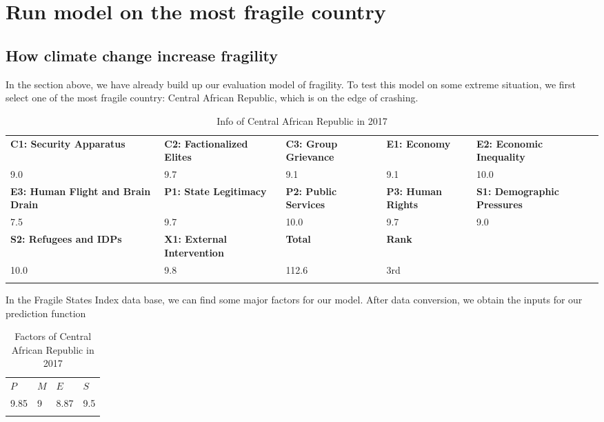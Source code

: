 \documentclass{mcmthesis}
\newlength\savedwidth
\newcommand\whline{\noalign{\global\savedwidth\arrayrulewidth
		\global\arrayrulewidth 1.2pt}%
	\hline
	\noalign{\global\arrayrulewidth\savedwidth}}
\newlength\savewidth
\newcommand\shline{\noalign{\global\savewidth\arrayrulewidth
		\global\arrayrulewidth 1.2pt}%
	\hline
	\noalign{\global\arrayrulewidth\savewidth}}
\begin{document}
	\section{Run model on the most fragile country}
	\subsection{How climate change increase fragility}
	In the section above, we have already build up our evaluation model of fragility. To test this model on some extreme situation, we first select one of the most fragile country: Central African Republic, which is on the edge of crashing.

	\begin{table}[htbp]
		\renewcommand\arraystretch{1.5}
		\footnotesize
		\centering
		\begin{tabular}{m{2.5cm}<{\centering}|m{2.5cm}<{\centering}|m{2.5cm}<{\centering}|m{2.5cm}<{\centering}|m{2.5cm}<{\centering}}
			\whline
			\textbf{C1: Security Apparatus}&\textbf{C2: Factionalized Elites}&\textbf{C3: Group Grievance}&\textbf{E1: Economy}&\textbf{E2: Economic Inequality} \\
			\whline
			9.0 & 9.7 & 9.1 & 9.1 & 10.0\\
			\whline
			\textbf{E3: Human Flight and Brain Drain}&\textbf{P1: State Legitimacy}&\textbf{P2: Public Services}&\textbf{P3: Human Rights}&\textbf{S1: Demographic Pressures} \\
			\whline
			7.5 & 9.7 & 10.0 & 9.7 & 9.0\\
			\whline
			\textbf{S2: Refugees and IDPs}&\textbf{X1: External Intervention}&\textbf{Total}& \textbf{Rank} & \\
			\whline
			10.0 & 9.8 & 112.6 & 3rd &\\
			\shline
		\end{tabular}
		\caption{Info of Central African Republic in 2017}\label{tab:Info of Central African Republic in 2017}
	\end{table}
	
	
	In the Fragile States Index data base, we can find some major factors for our model. After data conversion, we obtain the inputs for our prediction function
	
	\begin{table}[htbp]
		\renewcommand\arraystretch{1.5}
		\footnotesize
		\centering
		\begin{tabular}{m{2.5cm}<{\centering}|m{2.5cm}<{\centering}|m{2.5cm}<{\centering}|m{2.5cm}<{\centering}}
			\whline
			\textbf{$P$}&\textbf{$M$}&\textbf{$E$}&\textbf{$S$}\\
			\whline
			9.85 & 9 & 8.87 & 9.5 \\
			\shline
		\end{tabular}
		\caption{Factors of Central African Republic in 2017}\label{tab:Factors of Central African Republic in 2017}
	\end{table}
	
\end{document}
